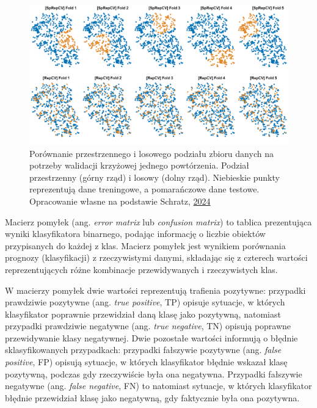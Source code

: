 \documentclass{amuthesis}
\begin{document}
\begin{figure}[t]

{\centering \includegraphics[width=1\textwidth,height=\textheight]{figures/spcv_plot.png}

}

\caption{\label{fig-rycina-spcv}Porównanie przestrzennego i losowego
podziału zbioru danych na potrzeby walidacji krzyżowej jednego
powtórzenia. Podział przestrzenny (górny rząd) i losowy (dolny rząd).
Niebieskie punkty reprezentują dane treningowe, a pomarańczowe dane
testowe. Opracowanie własne na podstawie Schratz,
\href{https://mlr.mlr-org.com/articles/tutorial/handling_of_spatial_data.html}{2024}}

\end{figure}

Macierz pomyłek (ang. \emph{error matrix} lub \emph{confusion matrix})
to tablica prezentująca wyniki klasyfikatora binarnego, podając
informację o liczbie obiektów przypisanych do każdej z klas. Macierz
pomyłek jest wynikiem porównania prognozy (klasyfikacji) z rzeczywistymi
danymi, składając się z czterech wartości reprezentujących różne
kombinacje przewidywanych i rzeczywistych klas.

W macierzy pomyłek dwie wartości reprezentują trafienia pozytywne:
przypadki prawdziwie pozytywne (ang. \emph{true positive}, TP) opisuje
sytuacje, w których klasyfikator poprawnie przewidział daną klasę jako
pozytywną, natomiast przypadki prawdziwie negatywne (ang. \emph{true
negative}, TN) opisują poprawne przewidywanie klasy negatywnej. Dwie
pozostałe wartości informują o błędnie sklasyfikowanych przypadkach:
przypadki fałszywie pozytywne (ang. \emph{false positive}, FP) opisują
sytuacje, w których klasyfikator błędnie wskazał klasę pozytywną,
podczas gdy rzeczywiście była ona negatywna. Przypadki fałszywie
negatywne (ang. \emph{false negative}, FN) to natomiast sytuacje, w
których klasyfikator błędnie przewidział klasę jako negatywną, gdy
faktycznie była ona pozytywna.
\end{document}
